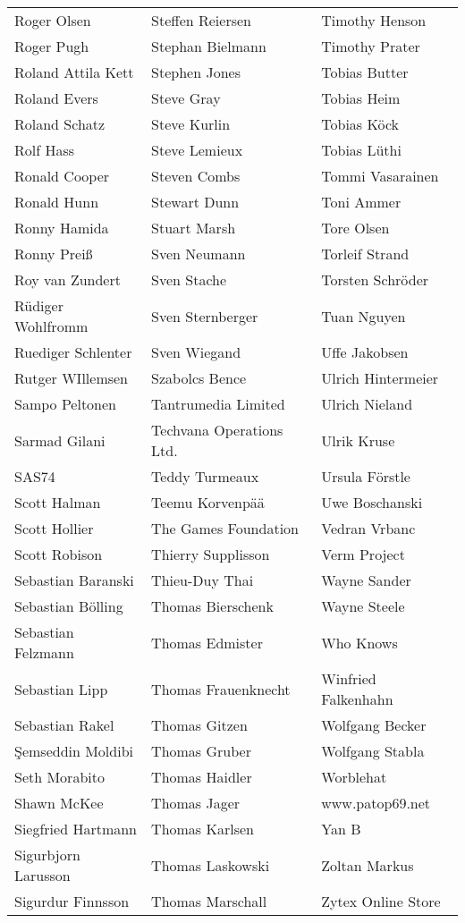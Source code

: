 \begin{small}
\begin{tabular}{p{4cm}p{4cm}p{4cm}}
Roger Olsen & Steffen Reiersen & Timothy Henson \\
Roger Pugh & Stephan Bielmann & Timothy Prater \\
Roland Attila Kett & Stephen Jones & Tobias Butter \\
Roland Evers & Steve Gray & Tobias Heim \\
Roland Schatz & Steve Kurlin & Tobias Köck \\
Rolf Hass & Steve Lemieux & Tobias Lüthi \\
Ronald Cooper & Steven Combs & Tommi Vasarainen \\
Ronald Hunn & Stewart Dunn & Toni Ammer \\
Ronny Hamida & Stuart Marsh & Tore Olsen \\
Ronny Preiß & Sven Neumann & Torleif Strand \\
Roy van Zundert & Sven Stache & Torsten Schröder \\
Rüdiger Wohlfromm & Sven Sternberger & Tuan Nguyen \\
Ruediger Schlenter & Sven Wiegand & Uffe Jakobsen \\
Rutger WIllemsen & Szabolcs Bence & Ulrich Hintermeier \\
Sampo Peltonen & Tantrumedia Limited & Ulrich Nieland \\
Sarmad Gilani & Techvana Operations Ltd. & Ulrik Kruse \\
SAS74 & Teddy Turmeaux & Ursula Förstle \\
Scott Halman & Teemu Korvenpää & Uwe Boschanski \\
Scott Hollier & The Games Foundation & Vedran Vrbanc \\
Scott Robison & Thierry Supplisson & Verm Project \\
Sebastian Baranski & Thieu-Duy Thai & Wayne Sander \\
Sebastian Bölling & Thomas Bierschenk & Wayne Steele \\
Sebastian Felzmann & Thomas Edmister & Who Knows \\
Sebastian Lipp & Thomas Frauenknecht & Winfried Falkenhahn \\
Sebastian Rakel & Thomas Gitzen & Wolfgang Becker \\
Şemseddin Moldibi & Thomas Gruber & Wolfgang Stabla \\
Seth Morabito & Thomas Haidler & Worblehat \\
Shawn McKee & Thomas Jager & www.patop69.net \\
Siegfried Hartmann & Thomas Karlsen & Yan B \\
Sigurbjorn Larusson & Thomas Laskowski & Zoltan Markus \\
Sigurdur Finnsson & Thomas Marschall & Zytex Online Store \\
\end{tabular}
\end{small}

